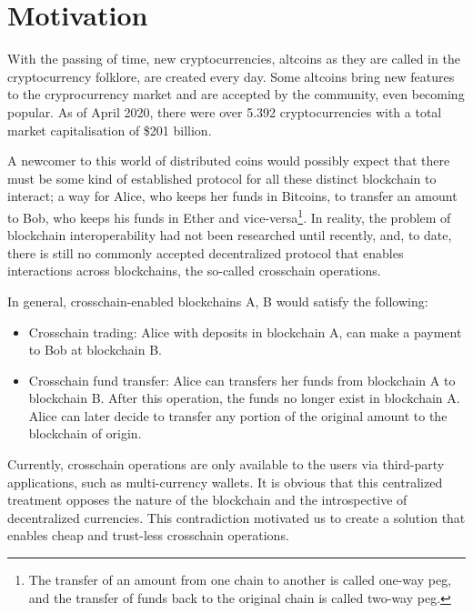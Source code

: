 \section{Motivation}

With the passing of time, new cryptocurrencies, altcoins as they are called in
the cryptocurrency folklore, are created every day. Some altcoins bring new
features to the cryprocurrency market and are accepted by the community, even
becoming popular. As of April 2020, there were over 5.392 cryptocurrencies with
a total market capitalisation of \$201 billion.

A newcomer to this world of distributed coins would possibly expect that there
must be some kind of established protocol for all these distinct blockchain to
interact; a way for Alice, who keeps her funds in Bitcoins, to transfer an
amount to Bob, who keeps his funds in Ether and vice-versa\footnote{The
    transfer of an amount from one chain to another is called one-way peg, and
the transfer of funds back to the original chain is called two-way peg.}.
In reality, the problem of blockchain interoperability had not been researched
until recently, and, to date, there is still no commonly accepted decentralized
protocol that enables interactions across blockchains, the so-called crosschain
operations.

\bigbreak
In general, crosschain-enabled blockchains A, B would satisfy the
following:

\begin{itemize}

    \item Crosschain trading: Alice with deposits in blockchain A, can make a
        payment to Bob at blockchain B.

    \item Crosschain fund transfer: Alice can transfers her funds from
        blockchain A to blockchain B. After this operation, the funds no longer
        exist in blockchain A. Alice can later decide to transfer any portion
        of the original amount to the blockchain of origin.

\end{itemize}

Currently, crosschain operations are only available to the users via
third-party applications, such as multi-currency wallets. It is obvious that
this centralized treatment opposes the nature of the blockchain and the
introspective of decentralized currencies. This contradiction motivated us to
create a solution that enables cheap and trust-less crosschain operations.

